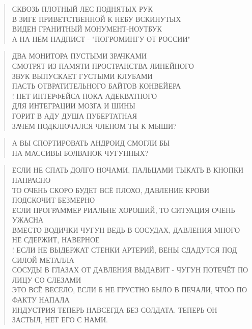 \poemtitle{***}
\begin{verse}
СКВОЗЬ ПЛОТНЫЙ ЛЕС ПОДНЯТЫХ РУК\\
В ЗИГЕ ПРИВЕТСТВЕННОЙ К НЕБУ ВСКИНУТЫХ\\
ВИДЕН ГРАНИТНЫЙ МОНУМЕНТ-НОУТБУК\\
А НА НЁМ НАДПИСТ - "ПОГРОМИНГУ ОТ РОССИИ"
\end{verse}

\poemtitle{***}
\begin{verse}
ДВА МОНИТОРА ПУСТЫМИ ЗРАЧКАМИ \\
СМОТРЯТ ИЗ ПАМЯТИ ПРОСТРАНСТВА ЛИНЕЙНОГО\\
ЗВУК ВЫПУСКАЕТ ГУСТЫМИ КЛУБАМИ\\
ПАСТЬ ОТВРАТИТЕЛЬНОГО БАЙТОВ КОНВЕЙЕРА\\!
НЕТ ИНТЕРФЕЙСА ПОКА АДЕКВАТНОГО\\
ДЛЯ ИНТЕГРАЦИИ МОЗГА И ШИНЫ\\
ГОРИТ В АДУ ДУША ПУБЕРТАТНАЯ\\
ЗАЧЕМ ПОДКЛЮЧАЛСЯ ЧЛЕНОМ ТЫ К МЫШИ?
\end{verse}

\poemtitle{***}
\begin{verse}
А ВЫ СПОРТИРОВАТЬ АНДРОИД СМОГЛИ БЫ\\
НА МАССИВЫ БОЛВАНОК ЧУГУННЫХ?
\end{verse}

\poemtitle{***}
\begin{verse}
ЕСЛИ НЕ СПАТЬ ДОЛГО НОЧАМИ, ПАЛЬЦАМИ ТЫКАТЬ В КНОПКИ НАПРАСНО\\
ТО ОЧЕНЬ СКОРО БУДЕТ ВСЁ ПЛОХО, ДАВЛЕНИЕ КРОВИ ПОДСКОЧИТ БЕЗМЕРНО\\
ЕСЛИ ПРОГРАММЕР РИАЛЬНЕ ХОРОШИЙ, ТО СИТУАЦИЯ ОЧЕНЬ УЖАСНА\\
ВМЕСТО ВОДИЧКИ ЧУГУН ВЕДЬ В СОСУДАХ, ДАВЛЕНИЯ МНОГО НЕ СДЕРЖИТ, НАВЕРНОЕ\\!
ЕСЛИ НЕ ВЫДЕРЖАТ СТЕНКИ АРТЕРИЙ, ВЕНЫ СДАДУТСЯ ПОД СИЛОЙ МЕТАЛЛА\\
СОСУДЫ В ГЛАЗАХ ОТ ДАВЛЕНИЯ ВЫДАВИТ - ЧУГУН ПОТЕЧЁТ ПО ЛИЦУ СО СЛЕЗАМИ\\
ЭТО ВСЁ ВЕСЕЛО, ЕСЛИ Б НЕ ГРУСТНО БЫЛО В ПЕЧАЛИ, ЧТОО ПО ФАКТУ НАПАЛА\\
ИНДУСТРИЯ ТЕПЕРЬ НАВСЕГДА БЕЗ СОЛДАТА. ТЕПЕРЬ ОН ЗАСТЫЛ, НЕТ ЕГО С НАМИ.
\end{verse}

